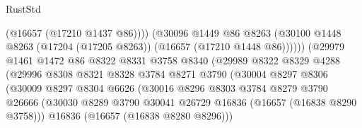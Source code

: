 \begin{lexlean}{RustStd}
\begin{coremodule}
                                          (@16657 (@17210 @1437 @86))))
                                      (@30096
                                        @1449
                                        @86
                                        @8263
                                        (@30100
                                          @1448
                                          @8263
                                          (@17204 (@17205 @8263))
                                          (@16657 (@17210 @1448 @86))))))
                                  (@29979
                                    @1461
                                    @1472
                                    @86
                                    @8322
                                    @8331
                                    @3758
                                    @8340
                                    (@29989
                                      @8322
                                      @8329
                                      @4288
                                      (@29996
                                        @8308
                                        @8321
                                        @8328
                                        @3784
                                        @8271
                                        @3790
                                        (@30004
                                          @8297
                                          @8306
                                          (@30009
                                            @8297
                                            @8304
                                            @6626
                                            (@30016
                                              @8296
                                              @8303
                                              @3784
                                              @8279
                                              @3790
                                              @26666
                                              (@30030
                                                @8289
                                                @3790
                                                @30041
                                                @26729
                                                @16836
                                                (@16657 (@16838 @8290 @3758)))
                                              @16836
                                              (@16657 (@16838 @8280 @8296)))

\end{coremodule}
\end{lexlean}
